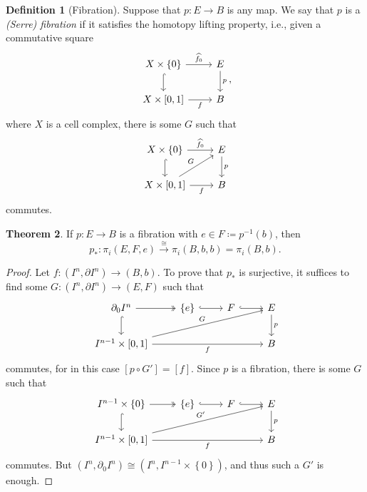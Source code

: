 \documentclass[10pt,letterpaper,cm]{nupset}
\theoremstyle{definition}
\newtheorem{defn}{Definition}[subsection]
\theoremstyle{theorem}
\newtheorem{theorem}[defn]{Theorem}
\theoremstyle{remark}
\newcommand{\1}{\mathbb{1}}
\newcommand{\0}{\vec 0}
\begin{document}
\begin{defn}[Fibration]
Suppose that $p: E \to B$ is any map. We say that $p$ is a \textit{(Serre) fibration} if it satisfies the homotopy lifting property, i.e., given a commutative square
\[
\begin{tikzcd}
X\times \{0\} \arrow[d, hook] \arrow[r, "\widehat{f_0}"] & E \arrow[d, "p"] \\
{X\times [0,1]} \arrow[r, "f"']                      & B               
\end{tikzcd}
,\]  where $X$ is a cell complex, there is some $G$ such that
\[
\begin{tikzcd}
X\times \{0\} \arrow[d, hook] \arrow[r, "\widehat{f_0}"] & E \arrow[d, "p"] \\
{X\times [0,1]} \arrow[r, "f"'] \arrow[ru, "G"]      & B               
\end{tikzcd}
\] commutes. 
\end{defn}

\begin{theorem}
If $p: E \to B$ is a fibration with $e \in F \coloneqq p^{-1}(b)$, then $$p_{\ast} : \pi_i(E, F, e) \overset{\cong}{\longrightarrow} \pi_i(B, b, b) = \pi_i(B, b).$$
\end{theorem}
\begin{proof}
Let $f: (I^n, \partial{I^n}) \to (B, b)$. To prove that $p_{\ast}$ is surjective, it suffices to find some $G : (I^n, \partial{I^n}) \to (E, F)$ such that 
\[
\begin{tikzcd}
\partial_0{I^n} \arrow[r, two heads] \arrow[d, hook]       & \{e\} \arrow[r, hook] & F \arrow[r, hook] & E \arrow[d, "p"] \\
{I^{n-1} \times [0,1]} \arrow[rrr, "f"'] \arrow[rrru, "G"] &                       &                   & B               
\end{tikzcd}
\] commutes, for in this case $\left[p \circ G'\right] = \left[f\right]$. Since $p$ is a fibration, there is some $G$ such that
\[
\begin{tikzcd}
I^{n-1} \times \{0\} \arrow[r, two heads] \arrow[d, hook]       & \{e\} \arrow[r, hook] & F \arrow[r, hook] & E \arrow[d, "p"] \\
{I^{n-1} \times [0,1]} \arrow[rrr, "f"'] \arrow[rrru, "G'"] &                       &                   & B               
\end{tikzcd}
\] 
commutes. But $\left(I^n, \partial_0{I^n}\right) \cong \left(I^n, I^{n-1} \times \left\{0\right\}\right)$, and thus such a $G'$ is enough. 
\end{proof}
\end{document}
